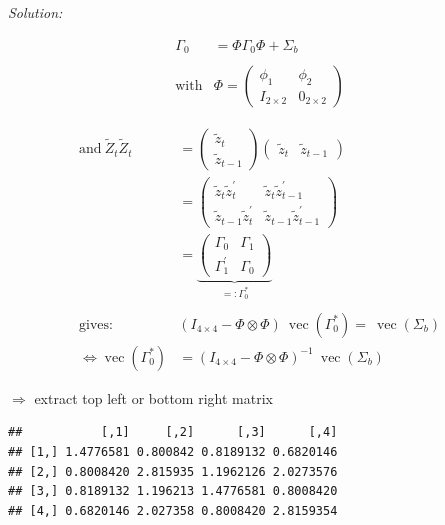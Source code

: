 \documentclass[12pt,a4paper]{article}
\renewcommand{\vec}{\operatorname{vec}}
\newenvironment{Shaded}{\begin{snugshade}}{\end{snugshade}}
\newcommand{\DataTypeTok}[1]{\textcolor[rgb]{0.13,0.29,0.53}{#1}}
\newcommand{\DecValTok}[1]{\textcolor[rgb]{0.00,0.00,0.81}{#1}}
\newcommand{\KeywordTok}[1]{\textcolor[rgb]{0.13,0.29,0.53}{\textbf{#1}}}
\newcommand{\NormalTok}[1]{#1}
\newcommand{\OperatorTok}[1]{\textcolor[rgb]{0.81,0.36,0.00}{\textbf{#1}}}
\newcommand{\StringTok}[1]{\textcolor[rgb]{0.31,0.60,0.02}{#1}}
\begin{document}
\emph{Solution:}

\begin{align*}
  \Gamma_0 & = \Phi \Gamma_0 \Phi + \Sigma_b \\
  \\
  \text{with} & \Phi = \begin{pmatrix} \phi_1 & \phi_2 \\
  I_{2 \times 2} & 0_{2 \times 2}
  \end{pmatrix}
  \end{align*}

\begin{align*}
  \text{and} \ \tilde{Z}_t \tilde{Z}_t & = \begin{pmatrix} \tilde{z}_t \\ \tilde{z}_{t -1} \end{pmatrix}   \begin{pmatrix} \tilde{z}_t & \tilde{z}_{t -1} \end{pmatrix} \\
  & =  \begin{pmatrix} \tilde{z}_t \tilde{z}_t^{'} & \tilde{z}_t \tilde{z}_{t -1}^{'} \\
   \tilde{z}_{t -1} \tilde{z}_t^{'} & \tilde{z}_{t -1} \tilde{z}_{t -1}^{'} \end{pmatrix} \\
   & = \underbrace{\begin{pmatrix} \Gamma_0 & \Gamma_1 \\ \Gamma_1^{'} & \Gamma_0 \end{pmatrix}}_{=: \Gamma_0^{*}}\\
   \\
   \text{gives:} & \left( I_{4 \times 4} - \Phi \otimes \Phi  \right) \ \vec(\Gamma_0^{*}) = \ \vec(\Sigma_b)\\
   \Leftrightarrow \vec(\Gamma_0^{*}) & = \left( I_{4 \times 4} - \Phi \otimes \Phi  \right)^{-1}  \ \vec(\Sigma_b)
\end{align*}

\(\Rightarrow\) extract top left or bottom right matrix

\begin{Shaded}
\end{Shaded}

\begin{verbatim}
##           [,1]     [,2]      [,3]      [,4]
## [1,] 1.4776581 0.800842 0.8189132 0.6820146
## [2,] 0.8008420 2.815935 1.1962126 2.0273576
## [3,] 0.8189132 1.196213 1.4776581 0.8008420
## [4,] 0.6820146 2.027358 0.8008420 2.8159354
\end{verbatim}
\end{document}
